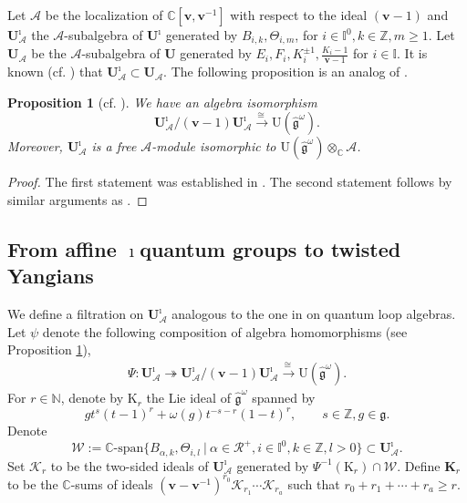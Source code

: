 \documentclass[11pt,reqno]{amsart}
\numberwithin{equation}{section}
\newtheorem{prop}[thm]{Proposition}
\theoremstyle{definition}
\theoremstyle{remark}
\newcommand{\beq}{\begin{equation}}
\newcommand{\eeq}{\end{equation}}
\newcommand{\bN}{\mathbb{N}}
\newcommand{\mc}{\mathcal}
\newcommand{\cR}{\mathcal{R}}
\newcommand{\g}{\mathfrak{g}}
\newcommand{\gge}{\geqslant}
\newcommand{\wt}{\widehat}
\newcommand{\rU}{{\mathrm{U}}}
\newcommand{\bv}{{\bm{v}}}
\def \Gr{\mathrm{Gr}}
\def \TH{\Theta}
\def \I{\mathbb{I}}
\def \TH{\Theta}
\def \U{\mathbf U}
\def \tUi{\mathbf{U}^\imath}
\def \Z{\mathbb{Z}}
\def \C{\mathbb{C}}
\def \A{\mathcal{A}}
\begin{document}
Let $\A$ be the localization of $\C[\bv,\bv^{-1}]$ with respect to the ideal $(\bv-1)$ and $\tUi_{\A}$ the $\A$-subalgebra of $\tUi$ generated by $B_{i,k},\TH_{i,m}$, for $i\in \I^0,k\in \Z, m\gge 1$. Let $\U_\A$ be the $\A$-subalgebra of $\U$ generated by $E_i,F_i,K_i^{\pm 1}, \frac{K_i-1}{\bv-1}$ for $i\in \I$. It is known (cf. \cite[Coro. 10.3]{Ko14}) that $\tUi_\A\subset \U_\A$. The following proposition is an analog of \cite[Prop. 2.1]{GM12}. 

\begin{prop}[cf. \cite{Ko14}]
\label{prop:GM}
We have an algebra isomorphism $$\tUi_\A / (\bv-1) \tUi_\A \stackrel{\cong~}{\longrightarrow} \rU(\wt{\g}^\omega).$$ Moreover, $\tUi_\A$ is a free $\A$-module isomorphic to $\rU(\wt{\g}^\omega) \otimes_{\C} \A$. 
\end{prop}
\begin{proof}
The first statement was established in \cite[Thm. 10.8]{Ko14}. The second statement follows by similar arguments as \cite[Prop.~3.3]{KLWZ23b}.
\end{proof}


\subsection{From affine $\imath$quantum groups to twisted Yangians}
\label{sec:filtration}

We define a filtration on $\tUi_\A $ analogous to the one in \cite[\S2]{CG15} on quantum loop algebras. %
Let $\psi$ denote the following composition of algebra homomorphisms (see Proposition \ref{prop:GM}),
\begin{align*}
\Psi:\tUi_{\A}\twoheadrightarrow \tUi_{\A}/(\bv-1)\tUi_\A
\stackrel{\cong~}{\longrightarrow} \mathrm{U}(\wt{\g}^{\omega}).
\end{align*}
For $r\in\bN$, denote by $\mathrm{K}_r$ the Lie ideal of $\wt{\g}^{\omega}$ spanned by
\[
g t^s(t-1)^r+\omega(g) t^{-s-r}(1-t)^r,\qquad s\in \Z,g\in \g.
\]
Denote
\beq\label{W}
\mathcal{W}:=\C\text{-span}
\{B_{\alpha,k},\TH_{i,l}~|~\alpha\in \cR^+, i\in \I^0,k\in \Z,l> 0\}\subset \U_\A^\imath.
\eeq
Set $\mathcal{K}_r$ to be the two-sided ideals of $\tUi_{\A}$ generated by $\Psi^{-1}(\mathrm{K}_r)\cap \mc W$. Define $\mathbf{K}_r$ to be the $\C$-sums of ideals $(\bv-\bv^{-1})^{r_0} \mathcal{K}_{r_1}\cdots \mathcal{K}_{r_a}$ such that $r_0+r_1+\cdots +r_a\gge r$.
\end{document}
